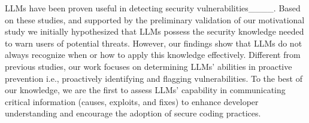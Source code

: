 LLMs have been proven useful in detecting security vulnerabilities____. Based on these studies, and supported by the preliminary validation of our motivational study we initially hypothesized that LLMs possess the security knowledge needed to warn users of potential threats. However, our findings show that LLMs do not always recognize when or how to apply this knowledge effectively. Different from previous studies, our work focuses on determining LLMs' abilities in proactive prevention i.e., proactively identifying and flagging vulnerabilities. To the best of our knowledge, we are the first to assess LLMs'  capability in communicating critical information (causes, exploits, and fixes) to enhance developer understanding and  encourage the adoption of secure coding practices. %




